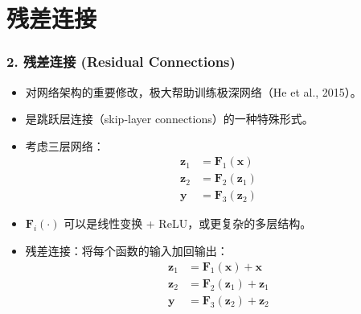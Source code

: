\documentclass[t,aspectratio=169]{beamer} %
\begin{document}
\section{残差连接}

\begin{frame}
    \frametitle{2. 残差连接 (Residual Connections)}
    \begin{itemize}
        \item 对网络架构的重要修改，极大帮助训练极深网络（He et al., 2015）。
        \item 是\alert{跳跃层连接}（skip-layer connections）的一种特殊形式。
        \item 考虑三层网络：
        \begin{align}
            \mathbf{z}_1 &= \mathbf{F}_1(\mathbf{x}) \tag{9.32} \\
            \mathbf{z}_2 &= \mathbf{F}_2(\mathbf{z}_1) \tag{9.33} \\
            \mathbf{y} &= \mathbf{F}_3(\mathbf{z}_2) \tag{9.34}
        \end{align}
        \item $\mathbf{F}_i(\cdot)$ 可以是线性变换 + ReLU，或更复杂的多层结构。
        \item \alert{残差连接}：将每个函数的输入加回输出：
        \begin{align}
            \mathbf{z}_1 &= \mathbf{F}_1(\mathbf{x}) + \mathbf{x} \tag{9.35} \\
            \mathbf{z}_2 &= \mathbf{F}_2(\mathbf{z}_1) + \mathbf{z}_1 \tag{9.36} \\
            \mathbf{y} &= \mathbf{F}_3(\mathbf{z}_2) + \mathbf{z}_2 \tag{9.37}
        \end{align}
    \end{itemize}
\end{frame}
\end{document}
